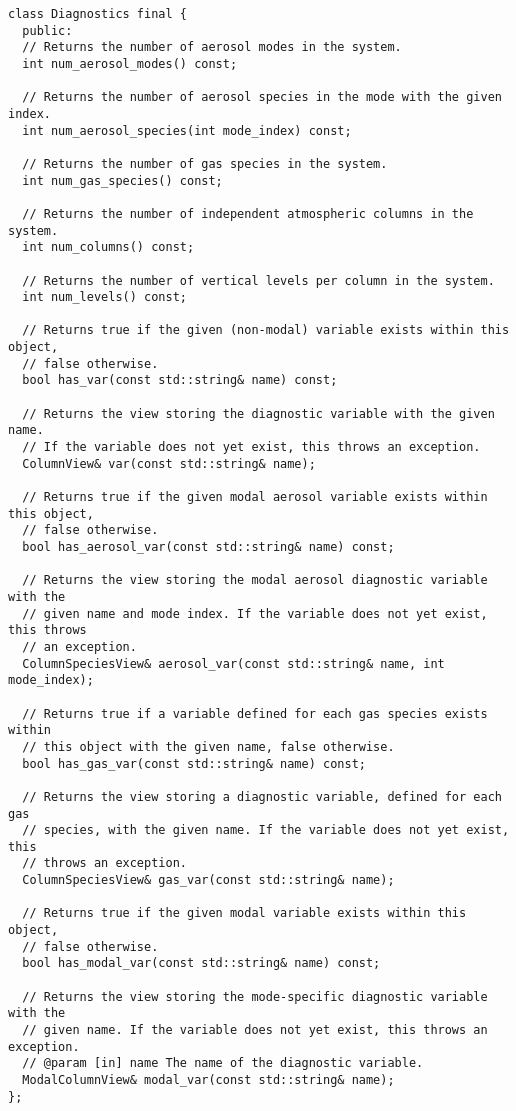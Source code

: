 \lstset{language=[11]c++}
\begin{lstlisting}
class Diagnostics final {
  public:
  // Returns the number of aerosol modes in the system.
  int num_aerosol_modes() const;

  // Returns the number of aerosol species in the mode with the given index.
  int num_aerosol_species(int mode_index) const;

  // Returns the number of gas species in the system.
  int num_gas_species() const;

  // Returns the number of independent atmospheric columns in the system.
  int num_columns() const;

  // Returns the number of vertical levels per column in the system.
  int num_levels() const;

  // Returns true if the given (non-modal) variable exists within this object,
  // false otherwise.
  bool has_var(const std::string& name) const;

  // Returns the view storing the diagnostic variable with the given name.
  // If the variable does not yet exist, this throws an exception.
  ColumnView& var(const std::string& name);

  // Returns true if the given modal aerosol variable exists within this object,
  // false otherwise.
  bool has_aerosol_var(const std::string& name) const;

  // Returns the view storing the modal aerosol diagnostic variable with the
  // given name and mode index. If the variable does not yet exist, this throws
  // an exception.
  ColumnSpeciesView& aerosol_var(const std::string& name, int mode_index);

  // Returns true if a variable defined for each gas species exists within
  // this object with the given name, false otherwise.
  bool has_gas_var(const std::string& name) const;

  // Returns the view storing a diagnostic variable, defined for each gas
  // species, with the given name. If the variable does not yet exist, this
  // throws an exception.
  ColumnSpeciesView& gas_var(const std::string& name);

  // Returns true if the given modal variable exists within this object,
  // false otherwise.
  bool has_modal_var(const std::string& name) const;

  // Returns the view storing the mode-specific diagnostic variable with the
  // given name. If the variable does not yet exist, this throws an exception.
  // @param [in] name The name of the diagnostic variable.
  ModalColumnView& modal_var(const std::string& name);
};
\end{lstlisting}


